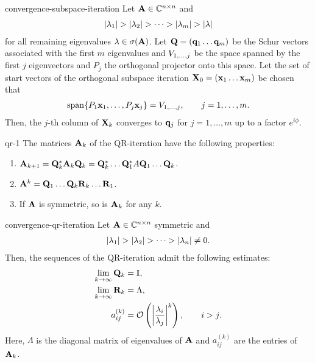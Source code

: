 \begin{Theorem}{convergence-subspace-iteration}
  Let $\mata\in\Cnn$ and
  \begin{gather}
    \abs{\lambda_1} >
    \abs{\lambda_2}>\dots>\abs{\lambda_m}>\abs{\lambda}
  \end{gather}
  for all
  remaining eigenvalues $\lambda\in\sigma(\mata)$. Let
  $\matq = (\vq_1\dots\vq_m)$ be the Schur vectors associated with the
  first $m$ eigenvalues and $\esp{1,\dots,j}$ be the space spanned by
  the first $j$ eigenvectors and $P_j$ the orthogonal projector
  onto this space. Let the set of start vectors of the orthogonal subspace iteration
  $\matx_0 = (\vx_1\dots\vx_m)$ be chosen that
  \begin{gather}
    \operatorname{span}\{P_1 \vx_1,\dots,P_j\vx_j\} = \esp{1,\dots,j},\qquad j=1,\dots,m.
  \end{gather}
  Then, the $j$-th column of $\matx_k$ converges to $\vq_j$ for $j=1,\dots,m$ up to a factor $e^{i\phi}$.
\end{Theorem}

\begin{Lemma}{qr-1}
  The matrices $\mata_k$ of the QR-iteration have the following properties:
  \begin{enumerate}
  \item $\mata_{k+1} = \matq_k^*\mata_k\matq_k = \matq_k^*\dots\matq_1^*A\matq_1\dots\matq_k$.
  \item $\mata^k=\matq_1\dots\matq_k\matr_k\dots\matr_1$.
  \item If $\mata$ is symmetric, so is $\mata_k$ for any $k$.
  \end{enumerate}
\end{Lemma}

\begin{Theorem}{convergence-qr-iteration}
  Let $\mata\in\Cnn$ symmetric and
  \begin{gather}
    \abs{\lambda_1} >
    \abs{\lambda_2}>\dots>\abs{\lambda_n} \neq 0.
  \end{gather}
  Then, the sequences of the QR-iteration admit the following estimates:
  \begin{align}
    \lim_{k\to\infty} \matq_k &= \id,\\
    \lim_{k\to\infty} \matr_k &= \Lambda,\\
    a_{ij}^{(k)} &= \bigo \left(\abs*{\frac{\lambda_i}{\lambda_j}}^k\right),
                   \qquad i>j.
  \end{align}
  Here, $\Lambda$ is the diagonal matrix of eigenvalues of $\mata$ and
  $a_{ij}^{(k)}$ are the entries of $\mata_k$.
\end{Theorem}


